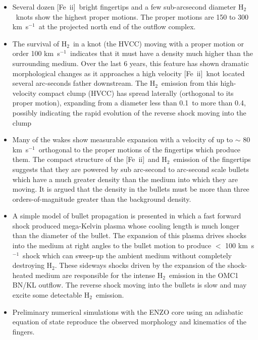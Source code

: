 \documentclass{aa}
\newcommand{\kms}{km~s{$^{-1}$}}
\newcommand{\Feii}{[Fe~{\sc ii}]}
\newcommand{\hh}{\ensuremath{\textrm{H}_{2}}}			%
\begin{document}
\begin{itemize}

\item  
Several dozen \Feii\ bright fingertips and a few sub-arcsecond diameter \hh\ 
knots show the highest proper motions.  The proper motions are 150 to
300 \kms\  at the  projected north end of the outflow complex.  

\item
The survival of \hh\ in a knot (the HVCC) moving with a proper motion or 
order 100 \kms\  indicates that it must have a density much higher than the 
surrounding medium. Over the last 6 years, this feature has shown dramatic 
morphological changes as it approaches a high velocity \Feii\ knot located  
several arc-seconds father 
downstream.   The \hh\ emission from this  high-velocity compact clump (HVCC)
has spread laterally (orthogonal to its proper motion), expanding from a diameter 
less than 0.1\arcsec\ to more than 0.4\arcsec , possibly indicating the rapid
evolution of the reverse shock moving into the clump

\item
Many of the wakes show measurable expansion with a velocity of up to $\sim$
80 \kms\ orthogonal to the proper motions of the fingertips which produce them. 
The compact structure of the \Feii\ and \hh\ emission of the fingertips suggests
that they are powered by sub arc-second to arc-second scale bullets which have
a much greater density than the medium into which they are moving.    It is argued that
the density in the bullets must be more than three orders-of-magnitude greater than 
the background  density. 

\item
A simple model of bullet propagation is presented in which a fast forward shock
produced mega-Kelvin plasma whose cooling length is much longer than
the diameter of the bullet.  The expansion of this plasma drives shocks into
the medium at right angles to the bullet motion to produce $<$ 100 \kms\ shock
which can sweep-up the ambient medium without completely destroying \hh .  These
sideways shocks driven by the expansion of the shock-heated medium are responsible
for the intense \hh\ emission in the OMC1 BN/KL outflow.   The reverse shock moving
into the bullets is slow and may excite some detectable \hh\ emission. 

\item
Preliminary numerical simulations with the ENZO core using an adiabatic equation 
of state reproduce the observed morphology and kinematics of the fingers. 



\end{itemize}
\end{document}
